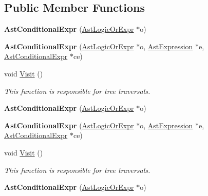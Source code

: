 \subsection*{Public Member Functions}
\begin{DoxyCompactItemize}
\item 
\hypertarget{classAstConditionalExpr_a4adcfd01b6eb5f4fb693e085a27953ee}{{\bfseries Ast\-Conditional\-Expr} (\hyperlink{classAstLogicOrExpr}{Ast\-Logic\-Or\-Expr} $\ast$o)}\label{classAstConditionalExpr_a4adcfd01b6eb5f4fb693e085a27953ee}

\item 
\hypertarget{classAstConditionalExpr_aa65a02af9e4ccd958607efcdabdc195f}{{\bfseries Ast\-Conditional\-Expr} (\hyperlink{classAstLogicOrExpr}{Ast\-Logic\-Or\-Expr} $\ast$o, \hyperlink{classAstExpression}{Ast\-Expression} $\ast$e, \hyperlink{classAstConditionalExpr}{Ast\-Conditional\-Expr} $\ast$ce)}\label{classAstConditionalExpr_aa65a02af9e4ccd958607efcdabdc195f}

\item 
void \hyperlink{classAstConditionalExpr_af62c2b118fd6064ec838435ffa72f48c}{Visit} ()
\begin{DoxyCompactList}\small\item\em This function is responsible for tree traversals. \end{DoxyCompactList}\item 
\hypertarget{classAstConditionalExpr_a4adcfd01b6eb5f4fb693e085a27953ee}{{\bfseries Ast\-Conditional\-Expr} (\hyperlink{classAstLogicOrExpr}{Ast\-Logic\-Or\-Expr} $\ast$o)}\label{classAstConditionalExpr_a4adcfd01b6eb5f4fb693e085a27953ee}

\item 
\hypertarget{classAstConditionalExpr_aa65a02af9e4ccd958607efcdabdc195f}{{\bfseries Ast\-Conditional\-Expr} (\hyperlink{classAstLogicOrExpr}{Ast\-Logic\-Or\-Expr} $\ast$o, \hyperlink{classAstExpression}{Ast\-Expression} $\ast$e, \hyperlink{classAstConditionalExpr}{Ast\-Conditional\-Expr} $\ast$ce)}\label{classAstConditionalExpr_aa65a02af9e4ccd958607efcdabdc195f}

\item 
void \hyperlink{classAstConditionalExpr_af62c2b118fd6064ec838435ffa72f48c}{Visit} ()
\begin{DoxyCompactList}\small\item\em This function is responsible for tree traversals. \end{DoxyCompactList}\item 
\hypertarget{classAstConditionalExpr_a4adcfd01b6eb5f4fb693e085a27953ee}{{\bfseries Ast\-Conditional\-Expr} (\hyperlink{classAstLogicOrExpr}{Ast\-Logic\-Or\-Expr} $\ast$o)}\label{classAstConditionalExpr_a4adcfd01b6eb5f4fb693e085a27953ee}


\end{DoxyCompactItemize}
